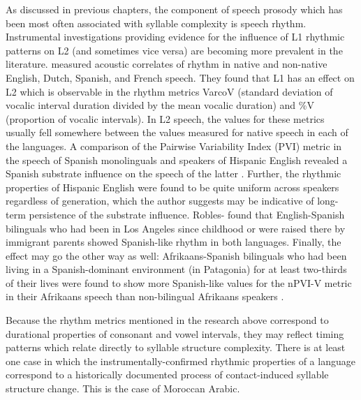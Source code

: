   As discussed in previous chapters, the component of speech prosody which has been most often associated with syllable complexity is speech rhythm. Instrumental investigations providing evidence for the influence of L1 rhythmic patterns on L2 (and sometimes vice versa) are becoming more prevalent in the literature. \citet{WhiteMattys2007} measured acoustic correlates of rhythm in native and non-native English, Dutch, Spanish, and French speech. They found that L1 has an effect on L2 which is observable in the rhythm metrics VarcoV (standard deviation of vocalic interval duration divided by the mean vocalic duration) and \%V (proportion of vocalic intervals). In L2 speech, the values for these metrics usually fell somewhere between the values measured for native speech in each of the languages. A comparison of the Pairwise Variability Index (PVI) metric in the speech of Spanish monolinguals and speakers of Hispanic English revealed a Spanish substrate influence on the speech of the latter \citep{Carter2005}. Further, the rhythmic properties of Hispanic English were found to be quite uniform across speakers regardless of generation, which the author suggests may be indicative of long-term persistence of  the substrate influence. Robles-\citet{Puente2014} found that English-Spanish bilinguals who had been in Los Angeles since childhood or were raised there by immigrant parents showed Spanish-like rhythm in both languages. Finally, the effect may go the other way as well: Afrikaans-Spanish bilinguals who had been living in a Spanish-dominant environment (in Patagonia) for at least two-thirds of their lives were found to show more Spanish-like values for the nPVI-V metric in their Afrikaans speech than non-bilingual Afrikaans speakers \citep{CoetzeeEtAl2015}. 



  Because the rhythm metrics mentioned in the research above correspond to durational properties of consonant and vowel intervals, they may reflect timing patterns which relate directly to syllable structure complexity. There is at least one case in which the instrumentally-confirmed rhythmic properties of a language correspond to a historically documented process of contact-induced syllable structure change. This is the case of Moroccan Arabic.



